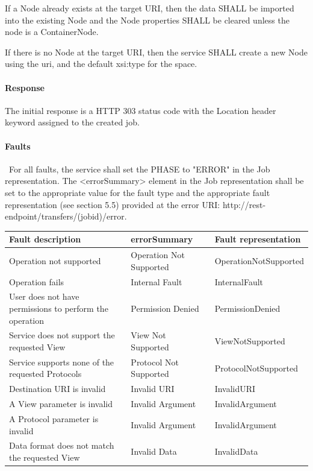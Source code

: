 \documentclass[11pt,a4paper]{ivoa}
\begin{document}
If a Node already exists at the target URI, then the data SHALL be imported into the existing Node and the Node properties SHALL be cleared unless the node is a ContainerNode.

If there is no Node at the target URI, then the service SHALL create a new Node using the uri, and the default xsi:type for the space.

\paragraph{Response}
The initial response is a HTTP 303 status code with the Location header keyword assigned to the created job.

\paragraph{Faults}\
For all faults, the service shall set the PHASE to "ERROR" in the Job representation. The <errorSummary> element in the Job representation shall be set to the appropriate value for the fault type and the appropriate fault representation (see section 5.5) provided at the error URI: http://rest-endpoint/transfers/(jobid)/error.

\vspace{3mm}
\begin{tabular}{ p{5cm} l p{4cm} }
\textbf{Fault description} & \textbf{errorSummary} & \textbf{Fault representation} \\
\hline
Operation not supported & Operation Not Supported & OperationNotSupported \\
\hline
Operation fails & Internal Fault & InternalFault \\
\hline
User does not have permissions to perform the operation	 & Permission Denied & PermissionDenied \\
\hline
Service does not support the requested View & View Not Supported & ViewNotSupported \\
\hline
Service supports none of the requested Protocols & Protocol Not Supported &ProtocolNotSupported \\
\hline
Destination URI is invalid & Invalid URI & InvalidURI \\
\hline
A View parameter is invalid & Invalid Argument & InvalidArgument \\
\hline
A Protocol parameter is invalid & Invalid Argument & InvalidArgument \\
\hline
Data format does not match the requested View & Invalid Data & InvalidData \\
\hline
\end{tabular}
\vspace{3mm}
\end{document}
